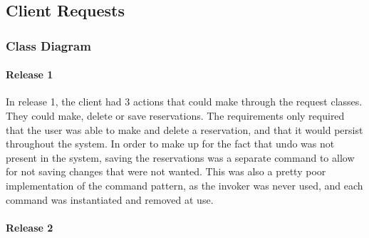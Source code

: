 
\subsection{Client Requests}\label{subsec:clientRequests}

\subsubsection{Class Diagram}
\paragraph{Release 1}

\indent
In release 1, the client had 3 actions that could make through the request classes.
They could make, delete or save reservations.
The requirements only required that the user was able to make and delete a reservation, and that it would persist throughout the system.
In order to make up for the fact that undo was not present in the system, saving the reservations was a separate command to allow for not saving changes that were not wanted.
This was also a pretty poor implementation of the command pattern, as the invoker was never used, and each command was instantiated and removed at use.

\begin{center}
\end{center}

\paragraph{Release 2}

